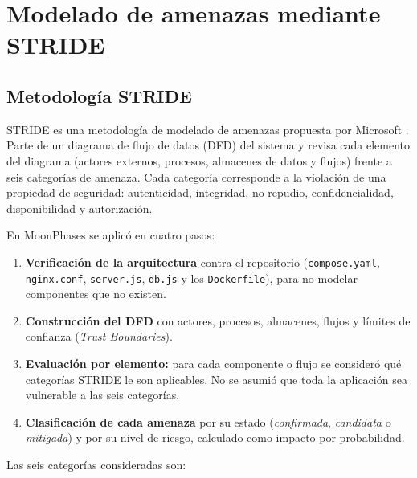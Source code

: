 
\chapter{Modelado de amenazas mediante STRIDE}

\section{Metodología STRIDE}

STRIDE es una metodología de modelado de amenazas propuesta por Microsoft
\cite{stride}. Parte de un diagrama de flujo de datos (DFD) del sistema y
revisa cada elemento del diagrama (actores externos, procesos, almacenes de
datos y flujos) frente a seis categorías de amenaza. Cada categoría
corresponde a la violación de una propiedad de seguridad: autenticidad,
integridad, no repudio, confidencialidad, disponibilidad y autorización.

En MoonPhases se aplicó en cuatro pasos:

\begin{enumerate}
    \item \textbf{Verificación de la arquitectura} contra el repositorio
    (\texttt{compose.yaml}, \texttt{nginx.conf}, \texttt{server.js},
    \texttt{db.js} y los \texttt{Dockerfile}), para no modelar componentes
    que no existen.
    \item \textbf{Construcción del DFD} con actores, procesos, almacenes,
    flujos y límites de confianza (\textit{Trust Boundaries}).
    \item \textbf{Evaluación por elemento:} para cada componente o flujo
    se consideró qué categorías STRIDE le son aplicables. No se asumió que
    toda la aplicación sea vulnerable a las seis categorías.
    \item \textbf{Clasificación de cada amenaza} por su estado
    (\textit{confirmada}, \textit{candidata} o \textit{mitigada}) y por su
    nivel de riesgo, calculado como impacto por probabilidad.
\end{enumerate}

Las seis categorías consideradas son:

